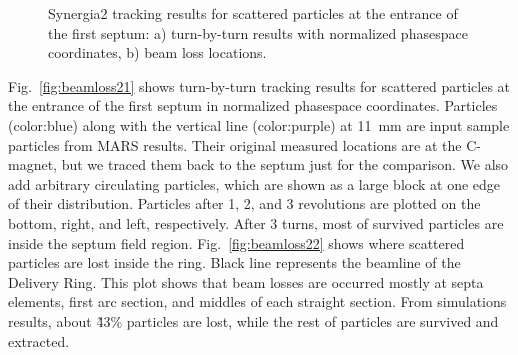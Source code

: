 \documentclass[aps,prstab,onecolumn,preprint,endfloats,11pt]{revtex4-1}
\begin{document}
\begin{figure}[!tbp]
  \caption{\label{fig:beamloss2}Synergia2 tracking results for scattered particles at the entrance of the first septum: a) turn-by-turn results with normalized phasespace coordinates, b) beam loss locations.}
\end{figure}

Fig.~\ref{fig:beamloss21} shows turn-by-turn tracking results for scattered particles at the entrance of the first septum in normalized phasespace coordinates. Particles (color:blue) along with the vertical line (color:purple) at 11~mm are input sample particles from MARS results. Their original measured locations are at the C-magnet, but we traced them back to the septum just for the comparison. We also add arbitrary circulating particles, which are shown as a large block at one edge of their distribution. Particles after 1, 2, and 3 revolutions are plotted on the bottom, right, and left, respectively. After 3 turns, most of survived particles are inside the septum field region. Fig.~\ref{fig:beamloss22} shows where scattered particles are lost inside the ring. Black line represents the beamline of the Delivery Ring. This plot shows that beam losses are occurred mostly at septa elements, first arc section, and middles of each straight section. From simulations results, about \~43\% particles are lost, while the rest of particles are survived and extracted. 
\end{document}

